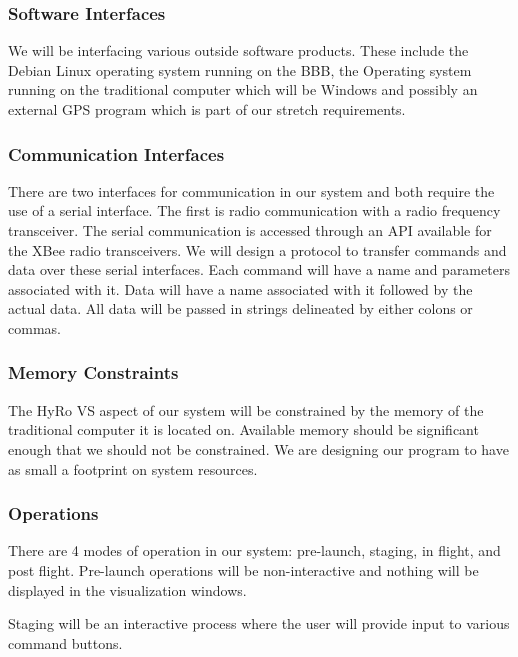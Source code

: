 \documentclass[10pt,draftclsnofoot,onecolumn,compsoc]{IEEEtran}
\begin{document}
\subsubsection{Software Interfaces}
	We will be interfacing various outside software products. These include the Debian Linux operating system running on the BBB, the Operating system running on the traditional computer which will be Windows and possibly an external GPS program which is part of our stretch requirements.

\subsubsection{Communication Interfaces}
There are two interfaces for communication in our system and both require the use of a serial interface. The first is radio communication with a radio frequency transceiver. The serial communication is accessed through an API available for the XBee radio transceivers. We will design a protocol to transfer commands and data over these serial interfaces. Each command will have a name and parameters associated with it. Data will have a name associated with it followed by the actual data. All data will be passed in strings delineated by either colons or commas.

\subsubsection{Memory Constraints}
The HyRo VS aspect of our system will be constrained by the memory of the traditional computer it is located on. Available memory should be significant enough that we should not be constrained. We are designing our program to have as small a footprint on system resources.\par 


\subsubsection {Operations}
There are 4 modes of operation in our system: pre-launch, staging, in flight, and post flight.  Pre-launch operations will be non-interactive and nothing will be displayed in the visualization windows. \par
	Staging will be an interactive process where the user will provide input to various command buttons.\par
	
\end{document}
